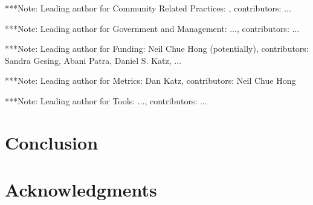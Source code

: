 \documentclass[11pt, oneside]{amsart}
\newcommand{\note}[1]{ {\textcolor{blueish}    { ***Note:      #1 }}}
\begin{document}
\note{Leading author for Community Related Practices: , contributors: ...}


\note{Leading author for Government and Management: ..., contributors: ...}


\note{Leading author for Funding: Neil Chue Hong (potentially), contributors: Sandra Gesing, Abani Patra, Daniel S. Katz, ...}


\note{Leading author for Metrics: Dan Katz, contributors: Neil Chue Hong}
 

\note{Leading author for Tools: ..., contributors: ...}


\section{Conclusion} \label{sec:conclusion}

\section*{Acknowledgments} \label{sec:acks}






\end{document}
